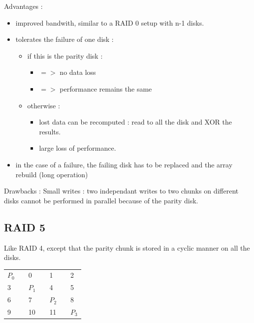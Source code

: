 \documentclass[a4paper,10pt]{report}
\newlength{\larg}
\begin{document}
Advantages :

\begin{itemize}
  \item improved bandwith, similar to a RAID 0 setup with n-1 disks.
  \item tolerates the failure of one disk :
  \begin{itemize}
    \item if this is the parity disk :
    \begin{itemize}
      \item $=>$ no data loss
      \item $=>$ performance remains the same
    \end{itemize}
    \item otherwise :
    \begin{itemize}
      \item lost data can be recomputed : read to all the disk and XOR the results.
      \item large loss of performance.
    \end{itemize}
  \end{itemize}
  \item in the case of a failure, the failing disk has to be replaced and the array rebuild (long operation)
\end{itemize}

Drawbacks :
Small writes : two independant writes to two chunks on different disks cannot be performed in parallel because of the parity disk.

\subsection{RAID 5}

Like RAID 4, except that the parity chunk is stored in a cyclic manner on all the disks.

\begin{figure}[h!]
  \begin{center}
    \caption{}
  \end{center}
\end{figure}

\begin{table}[h]
\begin{tabular}{|l|l|l|l|l|l|l|}
\cline{1-1} \cline{3-3} \cline{5-5} \cline{7-7}
$P_0$ &  & 0  &  & 1  &  & 2  \\ \cline{1-1} \cline{3-3} \cline{5-5} \cline{7-7} 
3  &  & $P_1$ &  & 4  &  & 5  \\ \cline{1-1} \cline{3-3} \cline{5-5} \cline{7-7} 
6  &  & 7  &  & $P_2$ &  & 8  \\ \cline{1-1} \cline{3-3} \cline{5-5} \cline{7-7} 
9  &  & 10 &  & 11 &  & $P_3$
\end{tabular}
\end{table}
\end{document}
